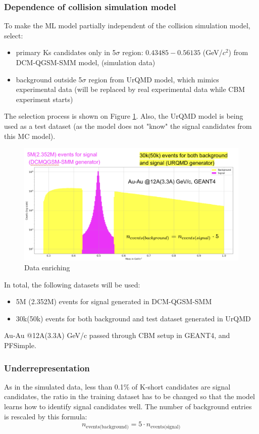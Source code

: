 \subsubsection{Dependence of collision simulation model}
To make the ML model partially independent of the collision simulation model,  select:
\begin{itemize}
    \item primary Ks candidates only in 5$\sigma$ region: $0.43485 - 0.56135$ (GeV/$c^2$) from DCM-QGSM-SMM model, (simulation data)
    \item background outside 5$\sigma$ region from UrQMD model, which mimics experimental data (will be replaced by real experimental data while CBM experiment starts)
\end{itemize}
 The selection process is shown on Figure \ref{enriching}. Also, the UrQMD model is being used as a test dataset (as the model does not "know" the signal candidates from this MC model).
\begin{figure}[H]
    \centering
    \includegraphics[width=.8\textwidth]{img/dataset.png}
    \caption{Data enriching}
    \label{enriching}
\end{figure}
In total, the following datasets will be used:
\begin{itemize}
    \item 5M (2.352M) events for signal generated in DCM-QGSM-SMM
    \item 30k(50k) events for both background and test dataset generated in UrQMD
\end{itemize}
Au-Au @12A(3.3A) GeV/c passed through CBM setup in GEANT4, and PFSimple.


\subsubsection{Underrepresentation}
As in the simulated data, less than 0.1\% of K-short candidates are signal candidates, the ratio in the training dataset has to be changed so that the model learns how to identify signal candidates well. The number of background entries is rescaled by this formula:
\begin{equation}
    n_\text{events(background)} = 5 \cdot n_\text{events(signal)}
\end{equation}


